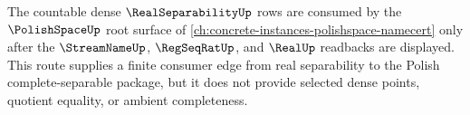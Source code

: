 The countable dense $\RealSeparabilityUp$ rows are consumed by the
$\PolishSpaceUp$ root surface of
\autoref{ch:concrete-instances-polishspace-namecert} only after the
$\StreamNameUp$, $\RegSeqRatUp$, and $\RealUp$ readbacks are displayed. This
route supplies a finite consumer edge from real separability to the Polish
complete-separable package, but it does not provide selected dense points,
quotient equality, or ambient completeness.
